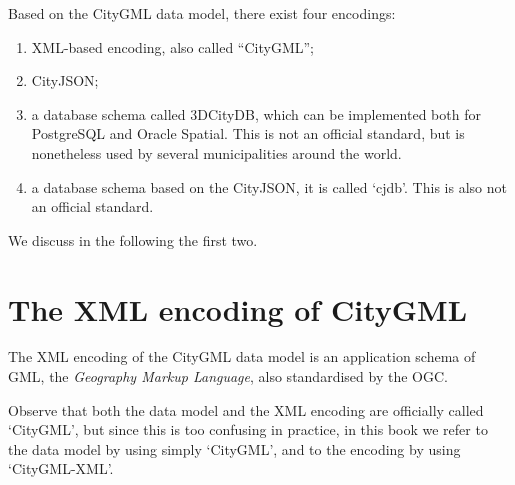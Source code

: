 Based on the CityGML data model, there exist four encodings:
\begin{enumerate}
  \item XML-based encoding, also called ``CityGML'';
  \item CityJSON;
  \item a database schema called 3DCityDB, which can be implemented both for PostgreSQL and Oracle Spatial. This is not an official standard, but is nonetheless used by several municipalities around the world.
  \item a database schema based on the CityJSON, it is called `cjdb'. This is also not an official standard.
\end{enumerate}
We discuss in the following the first two.


\section[XML-encoded CityGML]{The XML encoding of CityGML}%
\label{sec:citygmlxml}

The XML encoding of the CityGML data model is an application schema of GML, the \emph{Geography Markup Language}, also standardised by the OGC.

Observe that both the data model and the XML encoding are officially called `CityGML', but since this is too confusing in practice, in this book we refer to the data model by using simply `CityGML', and to the encoding by using `CityGML-XML'.


%

